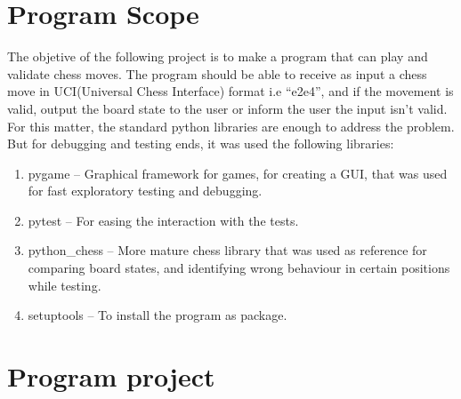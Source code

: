\documentclass[10pt]{article}
\author{}
\title{}
\date{}
\begin{document}
\maketitle

\section{Program Scope}

The objetive of the following project is to make a program that can play and
validate chess moves. The program should be able to receive as input a chess move in UCI(Universal Chess Interface) format i.e
``e2e4'', and if the movement is valid, output the board state to the user or inform
the user the input isn't valid. For this matter, the standard python libraries
are enough to address the problem. But for debugging and testing ends, it was
used the following libraries:

\begin{enumerate}[label=\alph*)]
\item pygame -- Graphical framework for games, for creating a GUI, that was used
    for fast exploratory testing and debugging.
\item pytest -- For easing the interaction with the tests.
\item python\_chess -- More mature chess library that was used as reference for comparing board states, and identifying wrong behaviour in certain positions while testing.
\item setuptools -- To install the program as package.
\end{enumerate}



\section{Program project}
\end{document}

